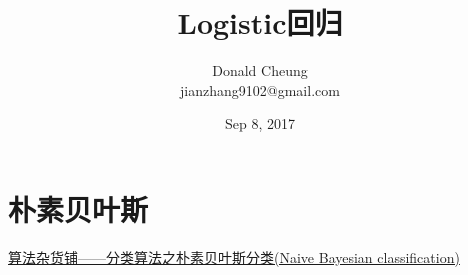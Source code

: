 \documentclass[10pt,a4paper]{ctexbook}
\begin{document}
    \setlength{\baselineskip}{20pt}
    \title{Logistic回归}
    \author{Donald Cheung\\jianzhang9102@gmail.com}
    \date{Sep 8, 2017}
    \tableofcontents
\fi

\chapter{朴素贝叶斯}

\href{http://www.cnblogs.com/leoo2sk/archive/2010/09/17/naive-bayesian-classifier.html}{算法杂货铺——分类算法之朴素贝叶斯分类(Naive Bayesian classification)}


\ifx\mlbook\undefined
    
\end{document}
